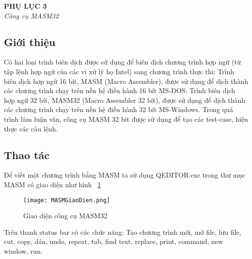 \begin{center}
	\begin{huge}
			\textbf{PHỤ LỤC 3}\\
			\textit{Công cụ MASM32}
	\end{huge}
\end{center}

	\subsection*{Giới thiệu}
	Có hai loại trình biên dịch được sử dụng để biên dịch chương trình hợp ngữ (từ tập lệnh hợp ngữ của các vi xử lý họ Intel) sang chương trình thực thi: Trình biên dịch hợp ngữ 16 bít, MASM (Macro Assembler), được sử dụng để dịch thành các chương trình chạy trên nền hệ điều hành 16 bít MS-DOS; Trình biên dịch hợp ngữ 32 bít, MASM32 (Macro Assembler 32 bít), được sử dụng để dịch thành các chương trình chạy trên nền hệ điều hành 32 bít  MS-Windows. Trong quá trình làm luận văn, công cụ MASM 32 bit được sử dụng để tạo các test-case, hiện thực các câu lệnh.
	
	\subsection*{Thao tác}
	Để viết một chương trình bằng MASM ta sử dụng QEDITOR.exe trong thư mục MASM có giao diện như hình ~\ref{fig:MASM}
	\begin{center}
			\begin{figure}[htp]
				\begin{center}
					\texttt{[image: MASMGiaoDien.png]}
				\end{center}
				\caption{Giao diện công cụ MASM32}	
					\label{fig:MASM}		
			\end{figure}
		\end{center}			
	
	
	Trên thanh status bar có các chức năng: Tạo chương trình mới, mở file, lưu file, cut, copy, dán, undo, repeat, tab, find text, replace, print, command, new window, run.\\

